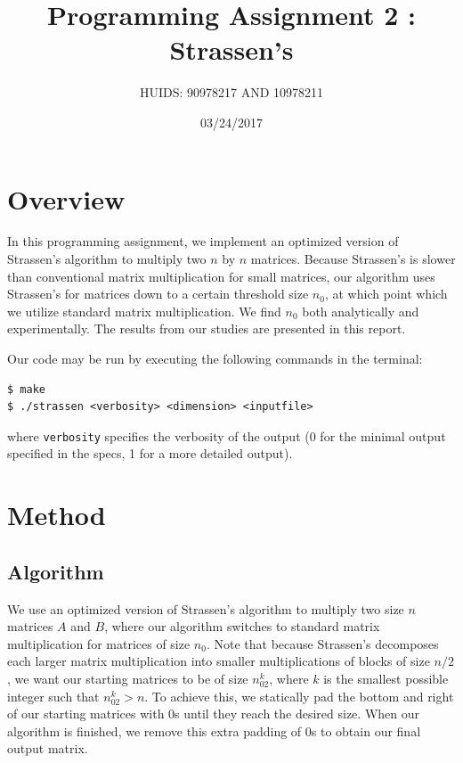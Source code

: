 \documentclass[a4paper]{article}
\title{Programming Assignment 2 : Strassen's}
\author{HUIDS: 90978217 AND 10978211}
\date{03/24/2017}
\begin{document}
\maketitle

\section{Overview}
In this programming assignment, we implement an optimized version of Strassen's algorithm to multiply two $n$ by $n$ matrices. Because Strassen's is slower than conventional matrix multiplication for small matrices, our algorithm uses Strassen's for matrices down to a certain threshold size $n_0$, at which point which we utilize standard matrix multiplication. We find $n_0$ both analytically and experimentally. The results from our studies are presented in this report.

Our code may be run by executing the following commands in the terminal:
\begin{verbatim}
$ make
$ ./strassen <verbosity> <dimension> <inputfile>
\end{verbatim}
where \texttt{verbosity} specifies the verbosity of the output (0 for the minimal output specified in the specs, 1 for a more detailed output).

\section{Method}
\subsection{Algorithm}
We use an optimized version of Strassen's algorithm to multiply two size $n$ matrices $A$ and $B$, where our algorithm switches to standard matrix multiplication for matrices of size $n_0$. Note that because Strassen's decomposes each larger matrix multiplication into smaller multiplications of blocks of size $n/2$, we want our starting matrices to be of size $n_02^k$, where $k$ is the smallest possible integer such that $n_02^k > n$. To achieve this, we statically pad the bottom and right of our starting matrices with 0s until they reach the desired size. When our algorithm is finished, we remove this extra padding of 0s to obtain our final output matrix.
\end{document}
